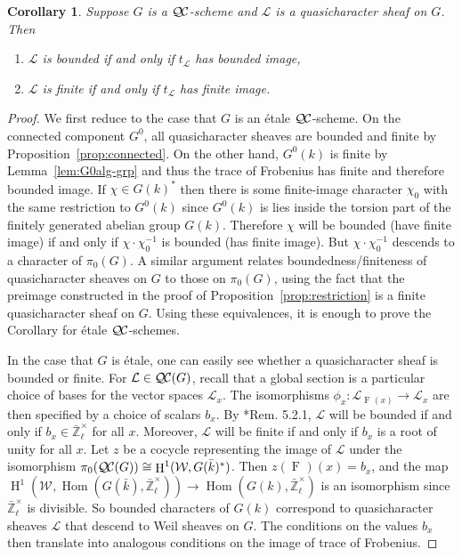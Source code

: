 \documentclass{amsart}
\theoremstyle{plain}
\newtheorem{corollary}[theorem]{Corollary}
\theoremstyle{definition}
\theoremstyle{remark}
\newcommand{\bFq}{\bar{k}}
\newcommand{\Fq}{k}
\newcommand{\Zlx}{\mathbb{\bar Z}_\ell^\times}
\newcommand{\Weil}[1]{\mathcal{W}_{#1}}
\newcommand{\Frob}[1]{\operatorname{F}_{#1}}
\DeclareMathOperator{\Hom}{Hom}
\DeclareMathOperator{\Hh}{H}
\newcommand{\qcs}[1]{{\mathcal{#1}}}
\newcommand{\QC}{{\mathcal{Q\hskip-0.8pt C}}}
\newcommand{\QCiso}[1]{\pi_0 (\QC(#1))}
\newcommand{\trFrob}[1]{t_{#1}}
\begin{document}
\begin{corollary} \label{cor:bounded-and-finite}
Suppose $G$ is a $\QC$-scheme and $\qcs{L}$ is a quasicharacter sheaf on $G$.  Then
\begin{enumerate}
\item $\qcs{L}$ is bounded if and only if $\trFrob{\qcs{L}}$ has bounded image,
\item $\qcs{L}$ is finite if and only if $\trFrob{\qcs{L}}$ has finite image.
\end{enumerate}
\end{corollary}
\begin{proof}
We first reduce to the case that $G$ is an \'etale $\QC$-scheme.  On the connected component
$G^0$, all quasicharacter sheaves are bounded and finite by Proposition~\ref{prop:connected}.
On the other hand, $G^0(\Fq)$ is finite by Lemma~\ref{lem:G0alg-grp} and thus the trace of Frobenius
has finite and therefore bounded image.  If $\chi \in G(\Fq)^*$ then there is some finite-image character $\chi_0$
with the same restriction to $G^0(\Fq)$ since $G^0(\Fq)$ is lies inside the torsion part of
the finitely generated abelian group $G(\Fq)$.  Therefore $\chi$ will be bounded (have finite image)
if and only if $\chi \cdot \chi_0^{-1}$ is bounded (has finite image).  But $\chi \cdot \chi_0^{-1}$ descends
to a character of $\pi_0(G)$.  A similar argument relates boundedness/finiteness of quasicharacter
sheaves on $G$ to those on $\pi_0(G)$, using the fact that the preimage constructed in the proof of
Proposition~\ref{prop:restriction} is a finite quasicharacter sheaf on $G$.
Using these equivalences, it is enough to prove the Corollary
for \'etale $\QC$-schemes.

In the case that $G$ is \'etale, one can easily see whether a quasicharacter sheaf is bounded or finite.
For $\qcs{L} \in \QC(G)$, recall that a global section is a particular choice of bases for the vector
spaces $\qcs{L}_x$.  The isomorphisms $\phi_x : \qcs{L}_{\Frob{}(x)} \to \qcs{L}_x$ are then specified
by a choice of scalars $b_x$.  By \cite{beilinson-bernstein-deligne:81a}*{Rem. 5.2.1},
$\qcs{L}$ will be bounded if and only if $b_x \in \Zlx$ for all $x$.  Moreover, $\qcs{L}$ will be
finite if and only if $b_x$ is a root of unity for all $x$.
Let $z$ be a cocycle representing the image of $\qcs{L}$ under the isomorphism
$\QCiso{G} \cong \Hh^1(\Weil{}, G(\bFq)^*)$.  Then $z(\Frob{})(x) = b_x$, and the
map $\Hh^1(\Weil{}, \Hom(G(\bFq), \Zlx)) \to \Hom(G(\Fq), \Zlx)$ is an isomorphism
since $\Zlx$ is divisible.  So bounded characters of $G(\Fq)$ correspond to quasicharacter sheaves
$\qcs{L}$ that descend to Weil sheaves on $G$.  The conditions on the values $b_x$ then
translate into analogous conditions on the image of trace of Frobenius.
\end{proof}
\end{document}

